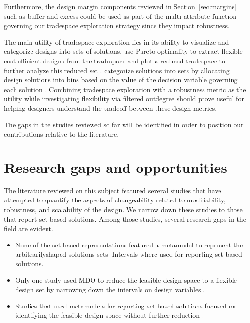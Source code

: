 Furthermore, the design margin components reviewed in Section~\ref{sec:margins} such as buffer and excess could be used as part of the multi-attribute function governing our tradespace exploration strategy since they impact robustness.

The main utility of tradespace exploration lies in its ability to visualize and categorize designs into sets of solutions. \citeauthor{Viscito2009} use Pareto optimality to extract flexible cost-efficient designs from the tradespace and plot a reduced tradespace to further analyze this reduced set \cite{Viscito2009} . \citeauthor{Small2019} categorize solutions into sets by allocating design solutions into bins based on the value of the decision variable governing each solution \cite{Small2019}. Combining tradespace exploration with a robustness metric as the utility while investigating flexibility via filtered outdegree should prove useful for helping designers understand the tradeoff between these design metrics.

The gaps in the studies reviewed so far will be identified in order to position our contributions relative to the literature.

\section{Research gaps and opportunities}
\label{sec:bgsummary}

The literature reviewed on this subject featured several studies that have attempted to quantify the aspects of changeability related to modifiability, robustness, and scalability of the design. We narrow down these studies to those that report set-based solutions. Among those studies, several research gaps in the field are evident.

\begin{itemize}
	\item None of the set-based representations featured a metamodel to represent the arbitrarily\-shaped solutions sets. Intervals where used for reporting set-based solutions.
	\item Only one study used \ac{MDO} to reduce the feasible design space to a flexible design set by narrowing down the intervals on design variables \cite{Hannapel2014}.
	\item Studies that used metamodels for reporting set-based solutions focused on identifying the feasible design space without further reduction \cite{Shahan2012,Yannou2003}.
\end{itemize}

